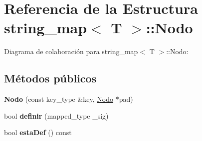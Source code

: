 \hypertarget{structstring__map_1_1Nodo}{\section{Referencia de la Estructura string\+\_\+map$<$ T $>$\+:\+:Nodo}
\label{structstring__map_1_1Nodo}
}


Diagrama de colaboración para string\+\_\+map$<$ T $>$\+:\+:Nodo\+:
\subsection*{Métodos públicos}
\begin{DoxyCompactItemize}
\item 
\hypertarget{structstring__map_1_1Nodo_a19c308573085a1d5b85af3abbd3733bd}{{\bfseries Nodo} (const key\+\_\+type \&key, \hyperlink{structstring__map_1_1Nodo}{Nodo} $\ast$pad)}\label{structstring__map_1_1Nodo_a19c308573085a1d5b85af3abbd3733bd}

\item 
\hypertarget{structstring__map_1_1Nodo_a7e9bbe215f4d430f26ff7a00f276aa3a}{bool {\bfseries definir} (mapped\+\_\+type \+\_\+sig)}\label{structstring__map_1_1Nodo_a7e9bbe215f4d430f26ff7a00f276aa3a}

\item 
\hypertarget{structstring__map_1_1Nodo_a87ec4314c91381cfa950a48c2837d240}{bool {\bfseries esta\+Def} () const }\label{structstring__map_1_1Nodo_a87ec4314c91381cfa950a48c2837d240}

\end{DoxyCompactItemize}
